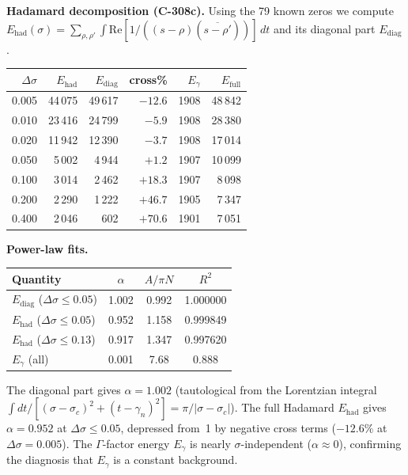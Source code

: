 \documentclass[11pt, a4paper]{article}
\theoremstyle{definition}
\theoremstyle{plain}
\begin{document}
\smallskip\noindent
\textbf{Hadamard decomposition (C-308c).}\;
Using the 79 known zeros we compute
$E_{\mathrm{had}}(\sigma)=\sum_{\rho,\rho'}\int\mathrm{Re}[1/((s{-}\rho)
(\overline{s{-}\rho'}))]\,dt$
and its diagonal part $E_{\mathrm{diag}}$.

\begin{center}
\small
\begin{tabular}{@{}rrrrrr@{}}
\toprule
$\Delta\sigma$ & $E_{\mathrm{had}}$ & $E_{\mathrm{diag}}$
  & cross\% & $E_\gamma$ & $E_{\mathrm{full}}$ \\
\midrule
0.005 & 44\,075 & 49\,617 & $-12.6$ & 1908 & 48\,842 \\
0.010 & 23\,416 & 24\,799 & $-5.9$  & 1908 & 28\,380 \\
0.020 & 11\,942 & 12\,390 & $-3.7$  & 1908 & 17\,014 \\
0.050 & 5\,002  & 4\,944  & $+1.2$  & 1907 & 10\,099 \\
0.100 & 3\,014  & 2\,462  & $+18.3$ & 1907 & 8\,098 \\
0.200 & 2\,290  & 1\,222  & $+46.7$ & 1905 & 7\,347 \\
0.400 & 2\,046  & 602     & $+70.6$ & 1901 & 7\,051 \\
\bottomrule
\end{tabular}
\end{center}

\smallskip\noindent
\textbf{Power-law fits.}\;
\begin{center}
\small
\begin{tabular}{@{}lccc@{}}
\toprule
Quantity & $\alpha$ & $A/\pi N$ & $R^2$ \\
\midrule
$E_{\mathrm{diag}}$ ($\Delta\sigma\leq 0.05$) & 1.002 & 0.992 & 1.000000 \\
$E_{\mathrm{had}}$ ($\Delta\sigma\leq 0.05$) & 0.952 & 1.158 & 0.999849 \\
$E_{\mathrm{had}}$ ($\Delta\sigma\leq 0.13$) & 0.917 & 1.347 & 0.997620 \\
$E_\gamma$ (all)          & 0.001 & 7.68  & 0.888 \\
\bottomrule
\end{tabular}
\end{center}

\noindent
The diagonal part gives $\alpha=1.002$ (tautological from the Lorentzian
integral $\int dt/[(\sigma{-}\sigma_c)^2+(t{-}\gamma_n)^2]=\pi/|\sigma{-}\sigma_c|$).
The full Hadamard $E_{\mathrm{had}}$ gives $\alpha=0.952$ at
$\Delta\sigma\leq 0.05$, depressed from~1 by negative cross terms
($-12.6\%$ at $\Delta\sigma=0.005$).
The $\Gamma$-factor energy $E_\gamma$ is nearly $\sigma$-independent
($\alpha\approx 0$), confirming the diagnosis that $E_\gamma$
is a constant background.
\end{document}
